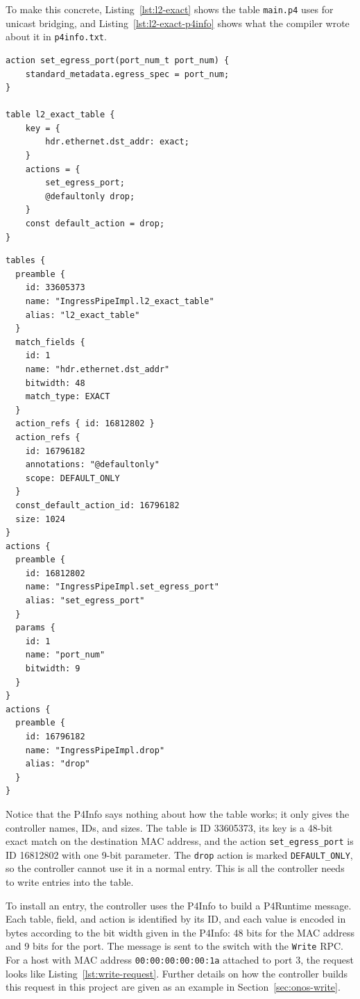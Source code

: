 To make this concrete, Listing~\ref{lst:l2-exact} shows the table \texttt{main.p4} uses for unicast bridging, and Listing~\ref{lst:l2-exact-p4info} shows what the compiler wrote about it in \texttt{p4info.txt}.

\begin{lstlisting}[caption={The \texttt{l2\_exact\_table} in \texttt{main.p4}.},label={lst:l2-exact}]
action set_egress_port(port_num_t port_num) {
    standard_metadata.egress_spec = port_num;
}

table l2_exact_table {
    key = {
        hdr.ethernet.dst_addr: exact;
    }
    actions = {
        set_egress_port;
        @defaultonly drop;
    }
    const default_action = drop;
}
\end{lstlisting}

\begin{lstlisting}[language={},caption={The P4Info entries for \texttt{l2\_exact\_table} and its actions.},label={lst:l2-exact-p4info}]
tables {
  preamble {
    id: 33605373
    name: "IngressPipeImpl.l2_exact_table"
    alias: "l2_exact_table"
  }
  match_fields {
    id: 1
    name: "hdr.ethernet.dst_addr"
    bitwidth: 48
    match_type: EXACT
  }
  action_refs { id: 16812802 }
  action_refs {
    id: 16796182
    annotations: "@defaultonly"
    scope: DEFAULT_ONLY
  }
  const_default_action_id: 16796182
  size: 1024
}
actions {
  preamble {
    id: 16812802
    name: "IngressPipeImpl.set_egress_port"
    alias: "set_egress_port"
  }
  params {
    id: 1
    name: "port_num"
    bitwidth: 9
  }
}
actions {
  preamble {
    id: 16796182
    name: "IngressPipeImpl.drop"
    alias: "drop"
  }
}
\end{lstlisting}

Notice that the P4Info says nothing about how the table works; it only gives the controller names, IDs, and sizes. The table is ID 33605373, its key is a 48-bit exact match on the destination MAC address, and the action \texttt{set\_egress\_port} is ID 16812802 with one 9-bit parameter. The \texttt{drop} action is marked \texttt{DEFAULT\_ONLY}, so the controller cannot use it in a normal entry. This is all the controller needs to write entries into the table.

To install an entry, the controller uses the P4Info to build a P4Runtime message. Each table, field, and action is identified by its ID, and each value is encoded in bytes according to the bit width given in the P4Info: 48 bits for the MAC address and 9 bits for the port. The message is sent to the switch with the \texttt{Write} RPC. For a host with MAC address \texttt{00:00:00:00:00:1a} attached to port 3, the request looks like Listing~\ref{lst:write-request}. Further details on how the controller builds this request in this project are given as an example in Section~\ref{sec:onos-write}.

